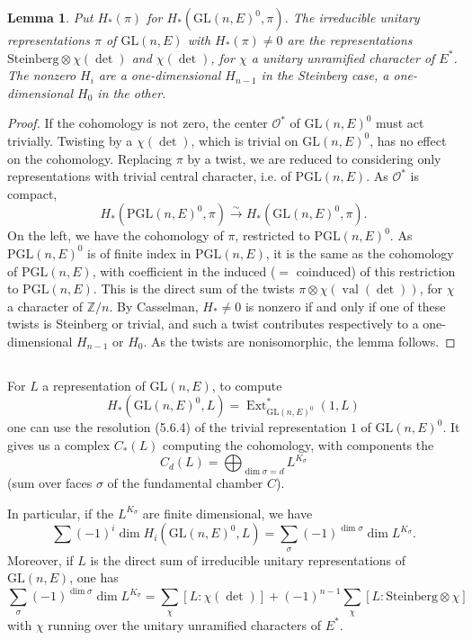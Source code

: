 \documentclass[11pt,a4paper]{article}
\theoremstyle{plain}
\newtheorem{lemma}[theorem]{Lemma}
\theoremstyle{definition}
\DeclareMathOperator{\Ext}{Ext}
\DeclareMathOperator{\val}{val}
\newcommand{\Z}{\mathbb{Z}}
\newcommand{\GL}{\mathrm{GL}}
\newcommand{\PGL}{\mathrm{PGL}}
\begin{document}
\begin{lemma}
Put $H_*(\pi)$ for $H_*(\GL(n,E)^0, \pi)$. The irreducible unitary representations $\pi$ of $\GL(n,E)$ with $H_*(\pi) \neq 0$ are the representations $\text{Steinberg} \otimes \chi(\det)$ and $\chi(\det)$, for $\chi$ a unitary unramified character of $E^*$. The nonzero $H_i$ are a one-dimensional $H_{n-1}$ in the Steinberg case, a one-dimensional $H_0$ in the other.
\end{lemma}

\begin{proof}
If the cohomology is not zero, the center $\mathcal{O}^*$ of $\GL(n,E)^0$ must act trivially. Twisting by a $\chi(\det)$, which is trivial on $\GL(n,E)^0$, has no effect on the cohomology. Replacing $\pi$ by a twist, we are reduced to considering only representations with trivial central character, i.e. of $\PGL(n,E)$. As $\mathcal{O}^*$ is compact,
\[
H_*(\PGL(n,E)^0, \pi) \xrightarrow{\sim} H_*(\GL(n,E)^0, \pi).
\]
On the left, we have the cohomology of $\pi$, restricted to $\PGL(n,E)^0$. As $\PGL(n,E)^0$ is of finite index in $\PGL(n,E)$, it is the same as the cohomology of $\PGL(n,E)$, with coefficient in the induced ($=$ coinduced) of this restriction to $\PGL(n,E)$. This is the direct sum of the twists $\pi \otimes \chi(\val(\det))$, for $\chi$ a character of $\Z/n$. By Casselman, $H_* \neq 0$ is nonzero if and only if one of these twists is Steinberg or trivial, and such a twist contributes respectively to a one-dimensional $H_{n-1}$ or $H_0$. As the twists are nonisomorphic, the lemma follows.
\end{proof}

\subsection{}
For $L$ a representation of $\GL(n,E)$, to compute
\[
H_*(\GL(n,E)^0, L) = \Ext^*_{\GL(n,E)^0}(1, L)
\]
one can use the resolution (5.6.4) of the trivial representation $1$ of $\GL(n,E)^0$. It gives us a complex $C_*(L)$ computing the cohomology, with components the
\begin{equation}
C_d(L) = \bigoplus_{\dim \sigma = d} L^{K_\sigma} \tag{5.9.1}
\end{equation}
(sum over faces $\sigma$ of the fundamental chamber $C$).

In particular, if the $L^{K_\sigma}$ are finite dimensional, we have
\[
\sum (-1)^i \dim H_i(\GL(n,E)^0, L) = \sum_\sigma (-1)^{\dim \sigma} \dim L^{K_\sigma}.
\]
Moreover, if $L$ is the direct sum of irreducible unitary representations of $\GL(n,E)$, one has
\begin{equation}
\sum_\sigma (-1)^{\dim \sigma} \dim L^{K_\sigma} = \sum_\chi [L : \chi(\det)] + (-1)^{n-1} \sum_\chi [L : \text{Steinberg} \otimes \chi] \tag{5.9.2}
\end{equation}
with $\chi$ running over the unitary unramified characters of $E^*$.
\end{document}

